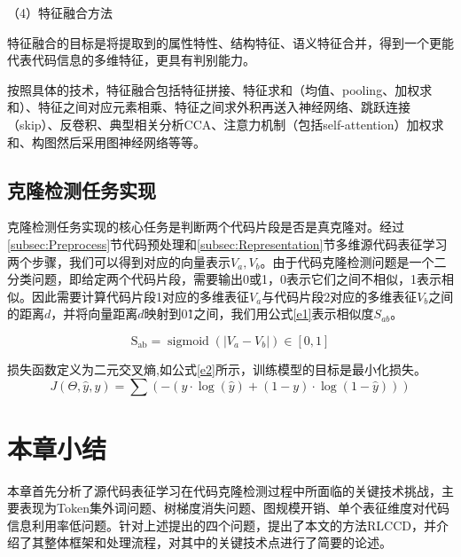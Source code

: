 （4）特征融合方法

特征融合的目标是将提取到的属性特性、结构特征、语义特征合并，得到一个更能代表代码信息的多维特征，更具有判别能力。

按照具体的技术，特征融合包括特征拼接、特征求和（均值、pooling、加权求和）、特征之间对应元素相乘、特征之间求外积再送入神经网络、跳跃连接（skip）、反卷积、典型相关分析CCA、注意力机制（包括self-attention）加权求和、构图然后采用图神经网络等等。

\subsection{克隆检测任务实现}
\label{subsec:Clone detection}
克隆检测任务实现的核心任务是判断两个代码片段是否是真克隆对。经过\ref{subsec:Preprocess}节代码预处理和\ref{subsec:Representation}节多维源代码表征学习两个步骤，我们可以得到对应的向量表示$V_{a},V_{b}$。由于代码克隆检测问题是一个二分类问题，即给定两个代码片段，需要输出0或1，0表示它们之间不相似，1表示相似。因此需要计算代码片段1对应的多维表征$V_{a}$与代码片段2对应的多维表征$V_{b}$之间的距离$d$，并将向量距离$d$映射到0\~1之间，我们用公式\ref{e1}表示相似度$S_{ab}$。

\begin{equation}\label{e1}
    \mathrm{S_{ab}}=\operatorname{sigmoid}\left(\left|V_{a}-V_{b}\right|\right) \in[0,1]
\end{equation}

损失函数定义为二元交叉熵,如公式\ref{e2}所示，训练模型的目标是最小化损失。
\begin{equation}\label{e2}
    J(\Theta, \hat{y}, y)=\sum(-(y \cdot \log (\hat{y})+(1-y) \cdot \log (1-\hat{y})))
\end{equation}


\section{本章小结}
\label{sec:Summary2}
本章首先分析了源代码表征学习在代码克隆检测过程中所面临的关键技术挑战，主要表现为Token集外词问题、树梯度消失问题、图规模开销、单个表征维度对代码信息利用率低问题。针对上述提出的四个问题，提出了本文的方法RLCCD，并介绍了其整体框架和处理流程，对其中的关键技术点进行了简要的论述。
